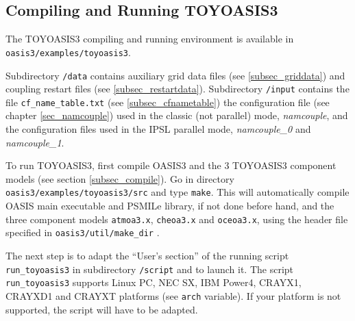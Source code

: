 \subsection{Compiling and Running TOYOASIS3}
\label{subsec_running_toyoasis3}

The TOYOASIS3 compiling and running environment is available in {\tt
  oasis3/examples/toyoasis3}.  

Subdirectory {\tt /data} contains auxiliary grid data files (see
\ref{subsec_griddata}) and coupling restart files (see
\ref{subsec_restartdata}). Subdirectory {\tt /input} contains the file
{\tt cf\_name\_table.txt} (see \ref{subsec_cfnametable}) the
configuration file (see chapter \ref{sec_namcouple}) used in the
classic (not parallel) mode, {\it namcouple}, and the
configuration files used in the IPSL parallel mode, {\it
  namcouple\_0} and {\it namcouple\_1}.

To run TOYOASIS3, first compile OASIS3 and the 3 TOYOASIS3 component
models (see section \ref{subsec_compile}). 
Go in directory {\tt oasis3/examples/toyoasis3/src} and type
{\tt make}.  This will automatically compile OASIS main executable and
PSMILe library, if not done before hand, and the three component
models {\tt atmoa3.x}, {\tt cheoa3.x} and {\tt oceoa3.x}, using the
header file specified in {\tt oasis3/util/make\_dir} .

The next step is to adapt the ``User's section'' of the running script
{\tt run\_toyoasis3} in subdirectory {\tt /script} and to launch it.
The script {\tt run\_toyoasis3} supports Linux PC, NEC SX, IBM
Power4, CRAYX1, CRAYXD1 and CRAYXT platforms (see {\tt arch}
variable). If your platform is not supported, the script will
have to be adapted.

